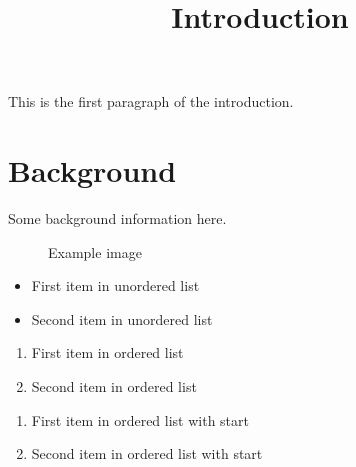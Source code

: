 \documentclass[11pt,a4paper]{article}
\title{Introduction}
\begin{document}
\maketitle

This is the first paragraph of the introduction.

\section{Background}

Some background information here.

\begin{figure}[h]
\caption{Example image}
\end{figure}

\begin{itemize}
\item First item in unordered list
\item Second item in unordered list
\end{itemize}

\begin{enumerate}
\item First item in ordered list
\item Second item in ordered list
\end{enumerate}

\begin{enumerate}
\item First item in ordered list with start
\item Second item in ordered list with start
\end{enumerate}
\end{document}

